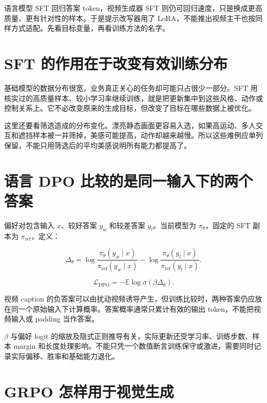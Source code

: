 语言模型 SFT 回归答案 token，视频生成器 SFT 则仍可回归速度，只是换成更高质量、更有针对性的样本。于是提示改写器用了 LoRA，不能推出视频主干也按同样方式适配。先看目标变量，再看训练方法的名字。

\section{SFT 的作用在于改变有效训练分布}\label{seedance-m09-sft-ux7684ux4f5cux7528ux5728ux4e8eux6539ux53d8ux6709ux6548ux8badux7ec3ux5206ux5e03}

基础模型的数据分布很宽，业务真正关心的任务却可能只占很少一部分。SFT 用核实过的高质量样本、较小学习率继续训练，就是把更新集中到这些风格、动作或控制关系上。它不必改变原来的生成目标，但改变了目标在哪些数据上被优化。

这里还要看筛选造成的分布变化。漂亮静态画面更容易入选，如果高运动、多人交互和遮挡样本被一并筛掉，美感可能提高，动作却越来越慢。所以这些难例应单列保留，不能只用筛选后的平均美感说明所有能力都提高了。

\section{语言 DPO 比较的是同一输入下的两个答案}\label{seedance-m09-ux8bedux8a00-dpo-ux6bd4ux8f83ux7684ux662fux540cux4e00ux8f93ux5165ux4e0bux7684ux4e24ux4e2aux7b54ux6848}

偏好对包含输入 \(x\)、较好答案 \(y_w\) 和较差答案 \(y_l\)。当前模型为 \(\pi_\theta\)，固定的 SFT 副本为 \(\pi_{\mathrm{ref}}\)，定义：

\[
\Delta_\theta=
\log\frac{\pi_\theta(y_w\mid x)}{\pi_{\mathrm{ref}}(y_w\mid x)}
-\log\frac{\pi_\theta(y_l\mid x)}{\pi_{\mathrm{ref}}(y_l\mid x)}.
\]

\[
\mathcal{L}_{\mathrm{DPO}}=-\mathbb{E}\log\sigma(\beta\Delta_\theta).
\]

视频 caption 的负答案可以由扰动视频诱导产生，但训练比较时，两种答案仍应放在同一个原始输入下计算概率。答案概率通常只累计有效的输出 token，不能把视频输入或 padding 当作答案。

\(\beta\) 与偏好 logit 的缩放及隐式正则推导有关，实际更新还受学习率、训练步数、样本 margin 和长度处理影响。不能只凭一个数值断言训练保守或激进，需要同时记录实际偏移、胜率和基础能力退化。

\section{GRPO 怎样用于视觉生成}\label{seedance-m09-grpo-ux600eux6837ux7528ux4e8eux89c6ux89c9ux751fux6210}

